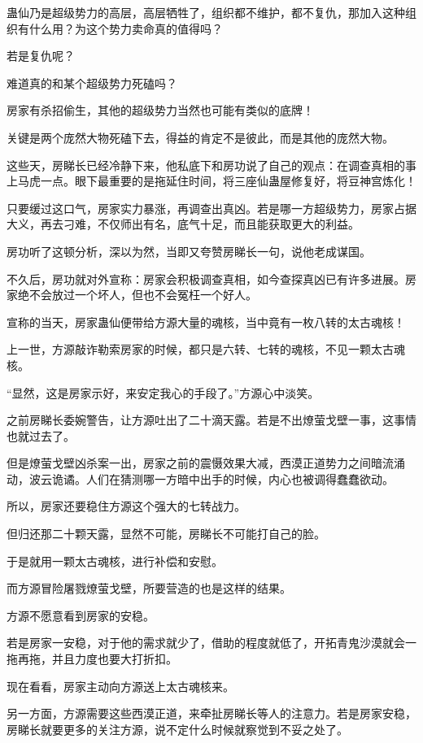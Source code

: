 \begin{this_body}
蛊仙乃是超级势力的高层，高层牺牲了，组织都不维护，都不复仇，那加入这种组织有什么用？为这个势力卖命真的值得吗？

若是复仇呢？

难道真的和某个超级势力死磕吗？

房家有杀招偷生，其他的超级势力当然也可能有类似的底牌！

关键是两个庞然大物死磕下去，得益的肯定不是彼此，而是其他的庞然大物。

这些天，房睇长已经冷静下来，他私底下和房功说了自己的观点：在调查真相的事上马虎一点。眼下最重要的是拖延住时间，将三座仙蛊屋修复好，将豆神宫炼化！

只要缓过这口气，房家实力暴涨，再调查出真凶。若是哪一方超级势力，房家占据大义，再去刁难，不仅师出有名，底气十足，而且能获取更大的利益。

房功听了这顿分析，深以为然，当即又夸赞房睇长一句，说他老成谋国。

不久后，房功就对外宣称：房家会积极调查真相，如今查探真凶已有许多进展。房家绝不会放过一个坏人，但也不会冤枉一个好人。

宣称的当天，房家蛊仙便带给方源大量的魂核，当中竟有一枚八转的太古魂核！

上一世，方源敲诈勒索房家的时候，都只是六转、七转的魂核，不见一颗太古魂核。

“显然，这是房家示好，来安定我心的手段了。”方源心中淡笑。

之前房睇长委婉警告，让方源吐出了二十滴天露。若是不出燎萤戈壁一事，这事情也就过去了。

但是燎萤戈壁凶杀案一出，房家之前的震慑效果大减，西漠正道势力之间暗流涌动，波云诡谲。人们在猜测哪一方暗中出手的时候，内心也被调得蠢蠢欲动。

所以，房家还要稳住方源这个强大的七转战力。

但归还那二十颗天露，显然不可能，房睇长不可能打自己的脸。

于是就用一颗太古魂核，进行补偿和安慰。

而方源冒险屠戮燎萤戈壁，所要营造的也是这样的结果。

方源不愿意看到房家的安稳。

若是房家一安稳，对于他的需求就少了，借助的程度就低了，开拓青鬼沙漠就会一拖再拖，并且力度也要大打折扣。

现在看看，房家主动向方源送上太古魂核来。

另一方面，方源需要这些西漠正道，来牵扯房睇长等人的注意力。若是房家安稳，房睇长就要更多的关注方源，说不定什么时候就察觉到不妥之处了。


\end{this_body}
